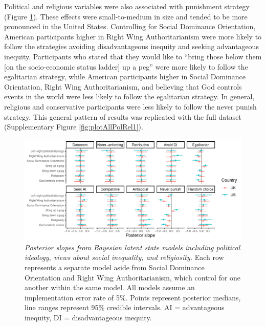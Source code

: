 \documentclass[
  man, donotrepeattitle,floatsintext]{apa6}
\begin{document}
Political and religious variables were also associated with punishment strategy
(Figure \ref{fig:plotAllPolRel2}). These effects were small-to-medium in size
and tended to be more pronounced in the United States. Controlling for Social
Dominance Orientation, American participants higher in Right Wing
Authoritarianism were more likely to follow the strategies avoiding
disadvantageous inequity and seeking advantageous inequity. Participants who
stated that they would like to ``bring those below them {[}on the socio-economic
status ladder{]} up a peg'' were more likely to follow the egalitarian strategy,
while American participants higher in Social Dominance Orientation, Right Wing
Authoritarianism, and believing that God controls events in the world were less
likely to follow the egalitarian strategy. In general, religious and
conservative participants were less likely to follow the never punish strategy.
This general pattern of results was replicated with the full dataset
(Supplementary Figure \ref{fig:plotAllPolRel1}).









\begin{figure}
\centering
\includegraphics{manuscript_files/figure-latex/plotAllPolRel2-1.pdf}
\caption{\label{fig:plotAllPolRel2}\emph{Posterior slopes from Bayesian latent state models
including political ideology, views about social inequality, and religiosity.}
Each row represents a separate model aside from Social Dominance Orientation and
Right Wing Authoritarianism, which control for one another within the same
model. All models assume an implementation error rate of 5\%. Points represent
posterior medians, line ranges represent 95\% credible intervals. AI =
advantageous inequity, DI = disadvantageous inequity.}
\end{figure}
\end{document}
